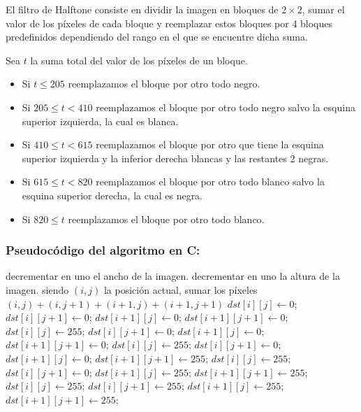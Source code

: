 El filtro de Halftone consiste en dividir la imagen en bloques de $2 \times 2$, sumar el valor de los píxeles de cada bloque y reemplazar estos bloques por 4 bloques predefinidos dependiendo del rango en el que se encuentre dicha suma. 

Sea $t$ la suma total del valor de los píxeles de un bloque.

\begin{itemize}
\item Si $t \leq 205$ reemplazamos el bloque por otro todo negro.
\item Si $205 \leq t < 410$ reemplazamos el bloque por otro todo negro salvo la esquina superior izquierda, la cual es blanca.
\item Si $410 \leq t < 615$ reemplazamos el bloque por otro que tiene la esquina superior izquierda y la inferior derecha blancas y las restantes 2 negras.
\item Si $615 \leq t < 820$ reemplazamos el bloque por otro todo blanco salvo la esquina superior derecha, la cual es negra.
\item Si $820 \leq t$ reemplazamos el bloque por otro todo blanco.
\end{itemize}


\subsubsection{Pseudocódigo del algoritmo en C:}

\begin{pseudocodigo}
    \STATE decrementar en uno el ancho de la imagen.
  \ENDIF
    \STATE decrementar en uno la altura de la imagen.
  \ENDIF
      \STATE siendo $(i,j)$ la posición actual, sumar los píxeles $(i,j) + (i,j+1) + (i+1,j) + (i+1,j+1)$
        \STATE $dst[i][j]     \leftarrow 0$;
        \STATE $dst[i][j+1]   \leftarrow 0$;
        \STATE $dst[i+1][j]   \leftarrow 0$;
        \STATE $dst[i+1][j+1] \leftarrow 0$;
      \ELSE
          \STATE $dst[i][j]     \leftarrow 255$;
          \STATE $dst[i][j+1]   \leftarrow 0$;
          \STATE $dst[i+1][j]   \leftarrow 0$;
          \STATE $dst[i+1][j+1] \leftarrow 0$;
        \ELSE
            \STATE $dst[i][j]     \leftarrow 255$;
            \STATE $dst[i][j+1]   \leftarrow 0$;
            \STATE $dst[i+1][j]   \leftarrow 0$;
            \STATE $dst[i+1][j+1] \leftarrow 255$;
          \ELSE
              \STATE $dst[i][j]     \leftarrow 255$;
              \STATE $dst[i][j+1]   \leftarrow 0$;
              \STATE $dst[i+1][j]   \leftarrow 255$;
              \STATE $dst[i+1][j+1] \leftarrow 255$;
            \ELSE 
              \STATE $dst[i][j]     \leftarrow 255$;
              \STATE $dst[i][j+1]   \leftarrow 255$;
              \STATE $dst[i+1][j]   \leftarrow 255$;
              \STATE $dst[i+1][j+1] \leftarrow 255$;
            \ENDIF
          \ENDIF
        \ENDIF
      \ENDIF
    \ENDFOR
  \ENDFOR
\end{pseudocodigo}


